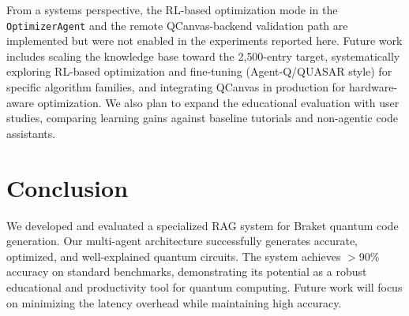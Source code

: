 \documentclass[runningheads]{llncs}
\begin{document}
From a systems perspective, the RL-based optimization mode in the \texttt{OptimizerAgent} and the remote QCanvas-backend validation path are implemented but were not enabled in the experiments reported here. Future work includes scaling the knowledge base toward the 2{,}500-entry target, systematically exploring RL-based optimization and fine-tuning (Agent-Q/QUASAR style) for specific algorithm families, and integrating QCanvas in production for hardware-aware optimization. We also plan to expand the educational evaluation with user studies, comparing learning gains against baseline tutorials and non-agentic code assistants.

\section{Conclusion}
We developed and evaluated a specialized RAG system for Braket quantum code generation. Our multi-agent architecture successfully generates accurate, optimized, and well-explained quantum circuits. The system achieves $>$90\% accuracy on standard benchmarks, demonstrating its potential as a robust educational and productivity tool for quantum computing. Future work will focus on minimizing the latency overhead while maintaining high accuracy.



\end{document}
